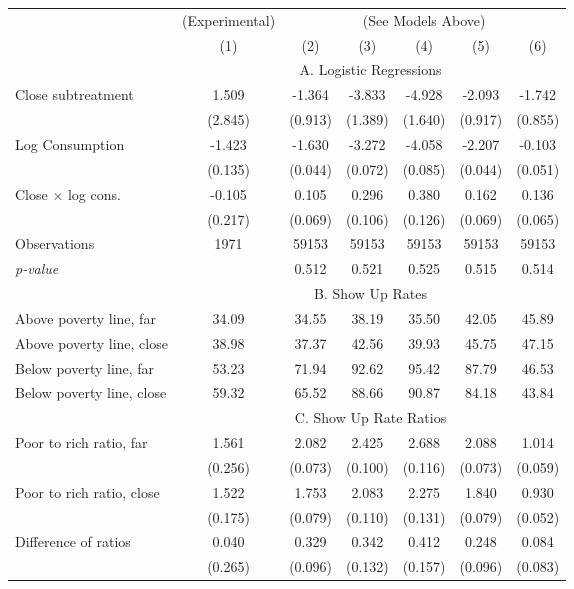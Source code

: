 \begin{tabular}{lcccccc}\toprule& (Experimental) & \multicolumn{5}{c}{(See Models Above)} \\ \cmidrule(lr){3-7} 
 & (1) & (2) & (3) & (4) & (5) & (6)\\\midrule
 & \multicolumn{6}{c}{\centering A. Logistic Regressions}\\\cmidrule(lr){2-7} 
Close subtreatment & 1.509 & -1.364 & -3.833 & -4.928 & -2.093 & -1.742 \\ & (2.845) & (0.913) & (1.389) & (1.640) & (0.917) & (0.855) \\Log Consumption & -1.423 & -1.630 & -3.272 & -4.058 & -2.207 & -0.103 \\ & (0.135) & (0.044) & (0.072) & (0.085) & (0.044) & (0.051) \\Close $\times$ log cons. & -0.105 & 0.105 & 0.296 & 0.380 & 0.162 & 0.136 \\ & (0.217) & (0.069) & (0.106) & (0.126) & (0.069) & (0.065) \\Observations & 1971 & 59153& 59153& 59153& 59153& 59153\\\textit{p-value} & & 0.512 & 0.521 & 0.525 & 0.515 & 0.514 \\\midrule
 & \multicolumn{6}{c}{\centering B. Show Up Rates}\\\cmidrule(lr){2-7} 
Above poverty line, far & 34.09 & 34.55 & 38.19 & 35.50 & 42.05 & 45.89 \\Above poverty line, close & 38.98 & 37.37 & 42.56 & 39.93 & 45.75 & 47.15 \\Below poverty line, far & 53.23 & 71.94 & 92.62 & 95.42 & 87.79 & 46.53 \\Below poverty line, close & 59.32 & 65.52 & 88.66 & 90.87 & 84.18 & 43.84 \\\midrule
 & \multicolumn{6}{c}{\centering C. Show Up Rate Ratios}\\\cmidrule(lr){2-7} 
Poor to rich ratio, far & 1.561 & 2.082 & 2.425 & 2.688 & 2.088 & 1.014 \\ & (0.256) & (0.073) & (0.100) & (0.116) & (0.073) & (0.059) \\Poor to rich ratio, close & 1.522 & 1.753 & 2.083 & 2.275 & 1.840 & 0.930 \\ & (0.175) & (0.079) & (0.110) & (0.131) & (0.079) & (0.052) \\Difference of ratios & 0.040 & 0.329 & 0.342 & 0.412 & 0.248 & 0.084 \\ & (0.265) & (0.096) & (0.132) & (0.157) & (0.096) & (0.083) \\\bottomrule\end{tabular}